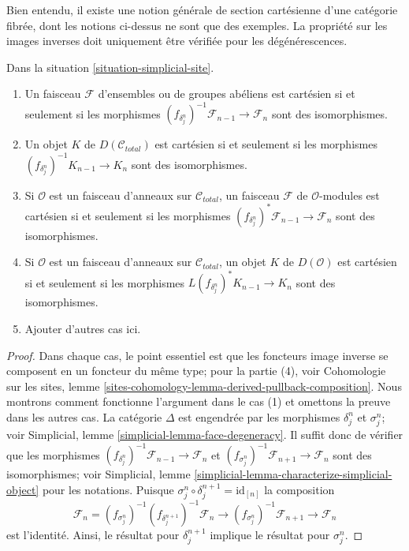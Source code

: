 \noindent
Bien entendu, il existe une notion générale de section cartésienne d'une
catégorie fibrée, dont les notions ci-dessus ne sont que des exemples.
La propriété sur les images inverses doit uniquement être vérifiée pour les dégénérescences.

\begin{lemma}
\label{lemma-check-cartesian-module}
Dans la situation \ref{situation-simplicial-site}.
\begin{enumerate}
\item Un faisceau $\mathcal{F}$ d'ensembles ou de groupes abéliens est cartésien
si et seulement si les morphismes
$(f_{\delta^n_j})^{-1}\mathcal{F}_{n - 1} \to \mathcal{F}_n$
sont des isomorphismes.
\item Un objet $K$ de $D(\mathcal{C}_{total})$ est cartésien
si et seulement si les morphismes
$(f_{\delta^n_j})^{-1}K_{n - 1} \to K_n$
sont des isomorphismes.
\item Si $\mathcal{O}$ est un faisceau d'anneaux sur $\mathcal{C}_{total}$,
un faisceau $\mathcal{F}$ de $\mathcal{O}$-modules est cartésien
si et seulement si les morphismes
$(f_{\delta^n_j})^*\mathcal{F}_{n - 1} \to \mathcal{F}_n$
sont des isomorphismes.
\item Si $\mathcal{O}$ est un faisceau d'anneaux sur $\mathcal{C}_{total}$,
un objet $K$ de $D(\mathcal{O})$ est cartésien
si et seulement si les morphismes
$L(f_{\delta^n_j})^*K_{n - 1} \to K_n$
sont des isomorphismes.
\item Ajouter d'autres cas ici.
\end{enumerate}
\end{lemma}

\begin{proof}
Dans chaque cas, le point essentiel est que les foncteurs image inverse
se composent en un foncteur du même type; pour la partie (4), voir
Cohomologie sur les sites, lemme
\ref{sites-cohomology-lemma-derived-pullback-composition}.
Nous montrons comment fonctionne l'argument dans le cas (1) et omettons la preuve
dans les autres cas.
La catégorie $\Delta$ est engendrée par les morphismes
$\delta^n_j$ et $\sigma^n_j$; voir
Simplicial, lemme \ref{simplicial-lemma-face-degeneracy}.
Il suffit donc de vérifier que les morphismes
$(f_{\delta^n_j})^{-1}\mathcal{F}_{n - 1} \to \mathcal{F}_n$
et $(f_{\sigma^n_j})^{-1}\mathcal{F}_{n + 1} \to \mathcal{F}_n$ sont
des isomorphismes; voir
Simplicial, lemme \ref{simplicial-lemma-characterize-simplicial-object}
pour les notations. Puisque $\sigma^n_j \circ \delta_j^{n + 1} = \text{id}_{[n]}$
la composition
$$
\mathcal{F}_n =
(f_{\sigma^n_j})^{-1}
(f_{\delta_j^{n + 1}})^{-1}
\mathcal{F}_n \to
(f_{\sigma^n_j})^{-1}
\mathcal{F}_{n + 1} \to
\mathcal{F}_n
$$
est l'identité. Ainsi, le résultat pour $\delta^{n + 1}_j$ implique le résultat
pour $\sigma^n_j$.
\end{proof}

